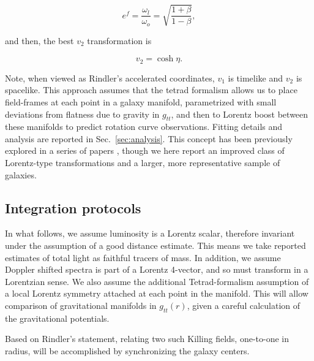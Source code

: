 \documentclass[reprint,%
 amsmath,amssymb,
 aps,
]{revtex4-1}
\begin{document}
\begin{equation}
    e^{f}=\frac{\omega_{l}}{\omega_o}= \sqrt{\frac{1+\beta}{1-\beta}},  
    \label{eq:flat}
\end{equation}  
     
and then, the best  $v_2$  transformation is 

\begin{equation}
v_{2} =  \cosh \eta.
\label{eq:hyperbolico}
\end{equation}


Note, when viewed as    Rindler's accelerated coordinates\cite{MTW,Wald, rindler2013essential}, $v_1$ is  timelike   and $v_2$ is spacelike.  This approach    assumes that the tetrad formalism allows us to place field-frames at each point in a galaxy manifold, parametrized with small deviations from flatness due to gravity in $g_{tt}$, and  then to Lorentz boost between these manifolds to predict rotation curve observations. 
  Fitting details and analysis are reported in Sec.~\ref{sec:analysis}. This concept has been previously explored in a series of papers \cite{Cisneros:2013vha,Cisneros:2014fea,Cisneros2015,Cisn2016}, though we here report an improved class of Lorentz-type transformations and a larger, more representative sample of galaxies. 
  
  
  
  
   
    
  
 
\subsection{Integration protocols \label{sec:gravDets}}

 In what follows, we    assume  luminosity   is a Lorentz scalar, therefore invariant under the assumption of a good distance estimate. This   means   we take reported   estimates of total light as faithful tracers of mass. 
   In addition, we assume   
   Doppler shifted spectra is part of a Lorentz 4-vector, and so    must transform in a Lorentzian sense. 
   We   also assume   the additional Tetrad-formalism assumption of a local Lorentz symmetry attached at each point in the manifold.  This will allow comparison of gravitational manifolds in $g_{tt}(r)$, given a careful calculation  of the gravitational potentials. 
   
   
 
Based on   Rindler's statement, relating two such Killing fields,  one-to-one in radius, will be accomplished  by synchronizing the galaxy centers. 
\end{document}
